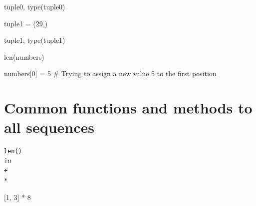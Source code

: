 \documentclass[
  letterpaper,
  DIV=11,
  numbers=noendperiod]{scrreprt}
\newenvironment{Shaded}{\begin{snugshade}}{\end{snugshade}}
\newcommand{\BuiltInTok}[1]{\textcolor[rgb]{0.00,0.23,0.31}{#1}}
\newcommand{\CommentTok}[1]{\textcolor[rgb]{0.37,0.37,0.37}{#1}}
\newcommand{\DecValTok}[1]{\textcolor[rgb]{0.68,0.00,0.00}{#1}}
\newcommand{\NormalTok}[1]{\textcolor[rgb]{0.00,0.23,0.31}{#1}}
\newcommand{\OperatorTok}[1]{\textcolor[rgb]{0.37,0.37,0.37}{#1}}
\begin{document}
\begin{Shaded}
\begin{Highlighting}[]
\NormalTok{tuple0, }\BuiltInTok{type}\NormalTok{(tuple0)}
\end{Highlighting}
\end{Shaded}

\begin{Shaded}
\begin{Highlighting}[]
\NormalTok{tuple1 }\OperatorTok{=}\NormalTok{ (}\DecValTok{29}\NormalTok{,)}
\end{Highlighting}
\end{Shaded}

\begin{Shaded}
\begin{Highlighting}[]
\NormalTok{tuple1, }\BuiltInTok{type}\NormalTok{(tuple1)}
\end{Highlighting}
\end{Shaded}

\begin{Shaded}
\begin{Highlighting}[]
\BuiltInTok{len}\NormalTok{(numbers)}
\end{Highlighting}
\end{Shaded}

\begin{Shaded}
\begin{Highlighting}[]
\NormalTok{numbers[}\DecValTok{0}\NormalTok{] }\OperatorTok{=} \DecValTok{5} \CommentTok{\# Trying to assign a new value 5 to the first position}
\end{Highlighting}
\end{Shaded}

\hypertarget{common-functions-and-methods-to-all-sequences-1}{%
\chapter{Common functions and methods to all
sequences}\label{common-functions-and-methods-to-all-sequences-1}}

\begin{verbatim}
len()
in
+ 
*
\end{verbatim}

\begin{Shaded}
\begin{Highlighting}[]
\NormalTok{[}\DecValTok{1}\NormalTok{, }\DecValTok{3}\NormalTok{] }\OperatorTok{*} \DecValTok{8}
\end{Highlighting}
\end{Shaded}
\end{document}

